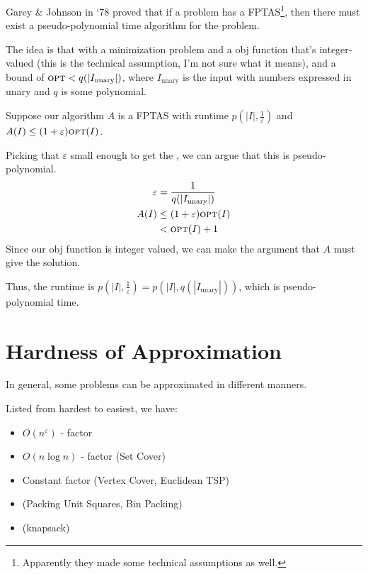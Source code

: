                     Garey \& Johnson in `78 proved that if a problem has a FPTAS\footnote{Apparently they made some technical assumptions as well.}, then there must exist a pseudo-polynomial time algorithm for the problem.

                    The idea is that with a minimization problem and a obj function that's integer-valued (this is the technical assumption, I'm not sure what it means), and a bound of $\textsc{opt} < q (|I_\text{unary}|)$, where $I_\text{unary}$ is the input with numbers expressed in unary and $q$ is some polynomial.

                    Suppose our algorithm $A$ is a FPTAS with runtime $p(|I|, \frac{1}{\varepsilon})$ and $A(I) \le (1 + \varepsilon) \textsc{opt}(I)$.

                    Picking that $\varepsilon$ small enough to get the \opt, we can argue that this is pseudo-polynomial.
                    \begin{align*}
                        \varepsilon &= \frac{1}{q(|I_\text{unary}|)} \\
                        A(I) &\le (1 + \varepsilon)\textsc{opt}(I) \\
                        &< \textsc{opt}(I) + 1
                    \end{align*}
                    Since our obj function is integer valued, we can make the argument that $A$ must give the \opt solution.

                    Thus, the runtime is $p(|I|, \frac{1}{\varepsilon}) = p(|I|, q(|I_\text{unary}|))$, which is pseudo-polynomial time.
        \chapter{Hardness of Approximation} %
        \label{cha:hardness_of_approximation}
            In general, some \npcomplete problems can be approximated in different manners.

            Listed from hardest to easiest, we have:
            \begin{itemize}
                \item $O(n^\varepsilon)$ - factor
                \item $O(n \log n)$ - factor (Set Cover)
                \item Constant factor (Vertex Cover, Euclidean TSP)
                \item \ptas (Packing Unit Squares, Bin Packing)
                \item \fptas (knapsack)
            \end{itemize}

